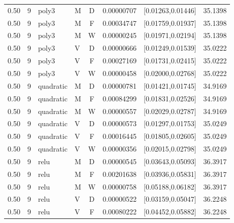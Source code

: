 \begin{longtable}{rrllcrrr}
0.50 & 9 & poly3 & M & D & 0.00000707 & [0.01263,0.01446] & 35.1398 \\

0.50 & 9 & poly3 & M & F & 0.00034747 & [0.01759,0.01937] & 35.1398 \\

0.50 & 9 & poly3 & M & W & 0.00000245 & [0.01971,0.02194] & 35.1398 \\

0.50 & 9 & poly3 & V & D & 0.00000666 & [0.01249,0.01539] & 35.0222 \\

0.50 & 9 & poly3 & V & F & 0.00027169 & [0.01731,0.02415] & 35.0222 \\

0.50 & 9 & poly3 & V & W & 0.00000458 & [0.02000,0.02768] & 35.0222 \\

0.50 & 9 & quadratic & M & D & 0.00000781 & [0.01421,0.01745] & 34.9169 \\

0.50 & 9 & quadratic & M & F & 0.00084299 & [0.01831,0.02526] & 34.9169 \\

0.50 & 9 & quadratic & M & W & 0.00000557 & [0.02029,0.02787] & 34.9169 \\

0.50 & 9 & quadratic & V & D & 0.00000573 & [0.01297,0.01753] & 35.0249 \\

0.50 & 9 & quadratic & V & F & 0.00016445 & [0.01805,0.02605] & 35.0249 \\

0.50 & 9 & quadratic & V & W & 0.00000356 & [0.02015,0.02798] & 35.0249 \\

0.50 & 9 & relu & M & D & 0.00000545 & [0.03643,0.05093] & 36.3917 \\

0.50 & 9 & relu & M & F & 0.00201638 & [0.03936,0.05831] & 36.3917 \\

0.50 & 9 & relu & M & W & 0.00000758 & [0.05188,0.06182] & 36.3917 \\

0.50 & 9 & relu & V & D & 0.00000522 & [0.03159,0.05047] & 36.2248 \\

0.50 & 9 & relu & V & F & 0.00080222 & [0.04452,0.05882] & 36.2248 \\


\end{longtable}
